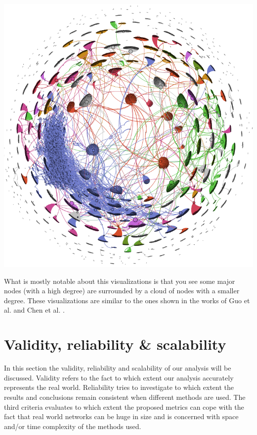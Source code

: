 \documentclass[10pt,a4paper]{article}
\newenvironment{Figure}
  {\par\medskip\noindent\minipage{\linewidth}}
  {\endminipage\par\medskip}
\begin{document}
\begin{multicols}{2}
\begin{Figure}
\centering
\label{fig:my_label}
\includegraphics[scale=0.385]{figures/Marc21_edges.png}
\label{clusters}
\end{Figure}

What is mostly notable about this visualizations is that you see some major nodes (with a high degree) are surrounded by a cloud of nodes with a smaller degree. These visualizations are similar to the ones shown in the works of Guo et al. \cite{GUO201958} and Chen et al. \cite{chenEthereum}.

\section{Validity, reliability \& scalability}

In this section the validity, reliability and scalability of our analysis will be discussed. Validity refers to the fact to which extent our analysis accurately represents the real world. Reliability tries to investigate to which extent the results and conclusions remain consistent when different methods are used. The third criteria evaluates to which extent the proposed metrics can cope with the fact that real world networks can be huge in size and is concerned with space and/or time complexity of the methods used. 


\end{multicols}
\end{document}
